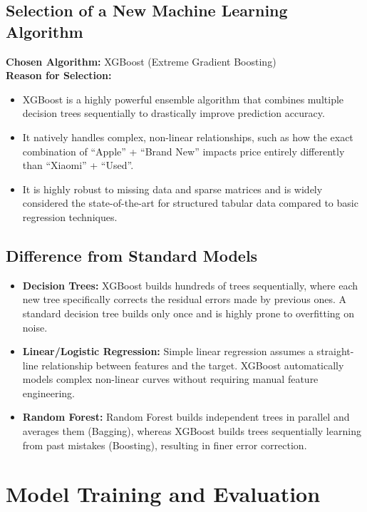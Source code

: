 \documentclass[12pt,a4paper]{article}
\begin{document}
\subsection{Selection of a New Machine Learning Algorithm}
\textbf{Chosen Algorithm:} XGBoost (Extreme Gradient Boosting) \\
\textbf{Reason for Selection:}
\begin{itemize}
    \item XGBoost is a highly powerful ensemble algorithm that combines multiple decision trees sequentially to drastically improve prediction accuracy. 
    \item It natively handles complex, non-linear relationships, such as how the exact combination of ``Apple'' + ``Brand New'' impacts price entirely differently than ``Xiaomi'' + ``Used''. 
    \item It is highly robust to missing data and sparse matrices and is widely considered the state-of-the-art for structured tabular data compared to basic regression techniques. 
\end{itemize}

\subsection{Difference from Standard Models}
\begin{itemize}
    \item \textbf{Decision Trees:} XGBoost builds hundreds of trees sequentially, where each new tree specifically corrects the residual errors made by previous ones. A standard decision tree builds only once and is highly prone to overfitting on noise. 
    \item \textbf{Linear/Logistic Regression:} Simple linear regression assumes a straight-line relationship between features and the target. XGBoost automatically models complex non-linear curves without requiring manual feature engineering. 
    \item \textbf{Random Forest:} Random Forest builds independent trees in parallel and averages them (Bagging), whereas XGBoost builds trees sequentially learning from past mistakes (Boosting), resulting in finer error correction.
\end{itemize}

\section{Model Training and Evaluation}
\end{document}
